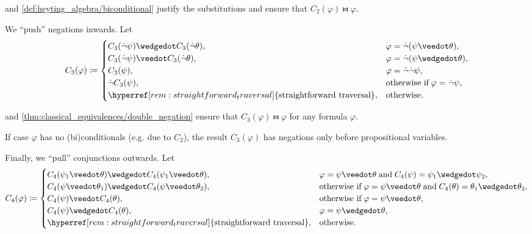 \begin{algorithm}
\begin{thmenum}
     and \cref{def:heyting_algebra/biconditional} justify the substitutions and ensure that \( C_2(\varphi) \gleichstark \varphi \).

     We \enquote{push} negations inwards. Let
    \begin{equation*}
      C_3(\varphi) \coloneqq \begin{cases}
        C_3(\synneg \psi) \synwedge C_3(\synneg \theta),                         &\varphi = \synneg (\psi \synvee \theta), \\
        C_3(\synneg \psi) \synvee C_3(\synneg \theta),                           &\varphi = \synneg (\psi \synwedge \theta), \\
        C_3(\psi),                                                               &\varphi = \synneg \synneg \psi, \\
        \synneg C_3(\psi),                                                       &\T{otherwise if} \varphi = \synneg \psi, \\
        \hyperref[rem:straightforward_traversal]{\T{straightforward traversal}}, &\T{otherwise.}
      \end{cases}
    \end{equation*}

     and \cref{thm:classical_equivalences/double_negation} ensure that \( C_3(\varphi) \gleichstark \varphi \) for any formula \( \varphi \).

    If case \( \varphi \) has no (bi)conditionals (e.g. due to \( C_2 \)), the result \( C_3(\varphi) \) has negations only before propositional variables.

     Finally, we \enquote{pull} conjunctions outwards. Let
    \begin{equation*}
      C_4(\varphi) \coloneqq \begin{cases}
        C_4(\psi_1 \synvee \theta) \synwedge C_4(\psi_1 \synvee \theta),         &\varphi = \psi \synvee \theta \T{and} C_4(\psi) = \psi_1 \synwedge \psi_2, \\
        C_4(\psi \synvee \theta_1) \synwedge C_4(\psi \synvee \theta_2),         &\T{otherwise if} \varphi = \psi \synvee \theta \T{and} C_4(\theta) = \theta_1 \synwedge \theta_2, \\
        C_4(\psi) \synvee C_4(\theta),                                           &\T{otherwise if} \varphi = \psi \synvee \theta, \\
        C_4(\psi) \synwedge C_4(\theta),                                         &\varphi = \psi \synwedge \theta, \\
        \hyperref[rem:straightforward_traversal]{\T{straightforward traversal}}, &\T{otherwise.}
      \end{cases}
    \end{equation*}


\end{thmenum}
\end{algorithm}
